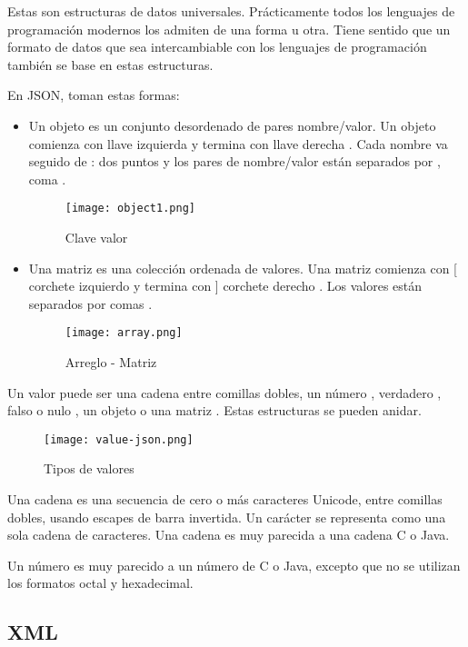 \begin{enumerate}
Estas son estructuras de datos universales. Prácticamente todos los lenguajes de programación modernos los admiten de una forma u otra. Tiene sentido que un formato de datos que sea intercambiable con los lenguajes de programación también se base en estas estructuras.

En JSON, toman estas formas:

\begin{itemize}
	\item Un objeto es un conjunto desordenado de pares nombre/valor. Un objeto comienza con { llave izquierda y termina con } llave derecha . Cada nombre va seguido de : dos puntos y los pares de nombre/valor están separados por , coma .
	\begin{figure}[H]
		\center
		\texttt{[image: object1.png]}
		\caption{Clave valor}
	\end{figure}
	\item Una matriz es una colección ordenada de valores. Una matriz comienza con [ corchete izquierdo y termina con ] corchete derecho . Los valores están separados por comas .
	\begin{figure}[H]
		\center
		\texttt{[image: array.png]}
		\caption{Arreglo - Matriz}
	\end{figure}
\end{itemize}

Un valor puede ser una cadena entre comillas dobles, un número , verdadero , falso o nulo , un objeto o una matriz . Estas estructuras se pueden anidar.

	\begin{figure}[H]
	\center
	\texttt{[image: value-json.png]}
	\caption{Tipos de valores}
\end{figure}
\begin{remark}
Una cadena es una secuencia de cero o más caracteres Unicode, entre comillas dobles, usando escapes de barra invertida. Un carácter se representa como una sola cadena de caracteres. Una cadena es muy parecida a una cadena C o Java.
\end{remark}
\begin{remark}
Un número es muy parecido a un número de C o Java, excepto que no se utilizan los formatos octal y hexadecimal.
\end{remark}

\subsection{XML}


\end{enumerate}
